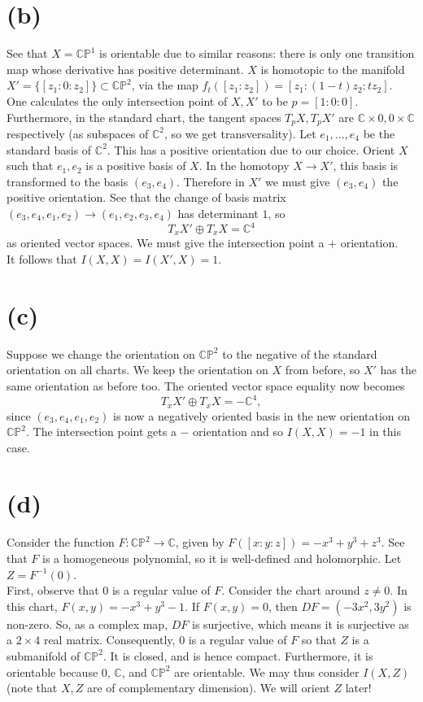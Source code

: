 \documentclass{amsbook}
\theoremstyle{theorem}
\theoremstyle{plain}
\theoremstyle{remark}
\newcommand{\C}{\mathbb C}
\renewcommand{\P}{\mathbb P}
\begin{document}
\section*{(b)}
See that $X = \C\P^1$ is orientable due to similar reasons: there is only one transition map whose derivative has positive determinant. $X$ is homotopic to the manifold $X' = \{[z_1:0:z_2]\} \subset \C\P^2$, via the map $f_t([z_1:z_2]) = [z_1: (1-t)z_2: tz_2]$. One calculates the only intersection point of $X,X'$ to be $p = [1:0:0]$. Furthermore, in the standard chart, the tangent spaces $T_pX, T_pX'$ are $\C\times 0, 0\times \C$ respectively (as subspaces of $\C^2$, so we get transversality). Let $e_1, \dots, e_4$ be the standard basis of $\C^2$. This has a positive orientation due to our choice. Orient $X$ such that $e_1, e_2$ is a positive basis of $X$. In the homotopy $X\to X'$, this basis is transformed to the basis $(e_3, e_4)$. Therefore in $X'$ we must give $(e_3, e_4)$ the positive orientation. See that the change of basis matrix $(e_3,e_4,e_1,e_2) \to (e_1,e_2,e_3,e_4)$ has determinant $1$, so \[T_xX'\oplus T_xX = \C^4\] as oriented vector spaces. We must give the intersection point a $+$ orientation.\\

It follows that $I(X,X) = I(X',X) = 1$.

\section*{(c)}

Suppose we change the orientation on $\C\P^2$ to the negative of the standard orientation on all charts. We keep the orientation on $X$ from before, so $X'$ has the same orientation as before too. The oriented vector space equality now becomes \[T_xX' \oplus T_xX = -\C^4,\] since $(e_3,e_4,e_1,e_2)$ is now a negatively oriented basis in the new orientation on $\C\P^2$. The intersection point gets a $-$ orientation and so $I(X,X) = -1$ in this case.

\section*{(d)}
Consider the function $F: \C\P^2 \to \C$, given by $F([x:y:z]) = - x^3 + y^3 + z^3$. See that $F$ is a homogeneous polynomial, so it is well-defined and holomorphic. Let $Z = F^{-1}(0)$. \\

First, observe that $0$ is a regular value of $F$. Consider the chart around $z \neq 0$. In this chart, $F(x,y) = -x^3+y^3-1$. If $F(x,y) = 0$, then $DF = (-3x^2, 3y^2)$ is non-zero. So, as a complex map, $DF$ is surjective, which means it is surjective as a $2\times 4$ real matrix. Consequently, $0$ is a regular value of $F$ so that $Z$ is a submanifold of $\C\P^2$. It is closed, and is hence compact. Furthermore, it is orientable because $0$, $\C$, and $\C\P^2$ are orientable. We may thus consider $I(X,Z)$ (note that $X,Z$ are of complementary dimension). We will orient $Z$ later!\\
\end{document}

